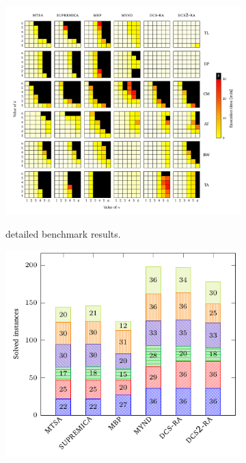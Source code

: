\begin{figure}[th]
    \centering
    \hspace*{-20mm}
    \begin{subfigure}{0.7\textwidth}
        \includegraphics[width=\linewidth]{figures/benchmark/tools_vs.pdf}\label{fig:tools:results:detailed}
        \caption{\DCS detailed benchmark results.}
    \end{subfigure}%
    \begin{subfigure}{0.5\textwidth}
        \includegraphics[width=0.9\linewidth]{figures/benchmark/tools_instances.pdf}\label{fig:tools:results:instances}

\end{subfigure}
\end{figure}
